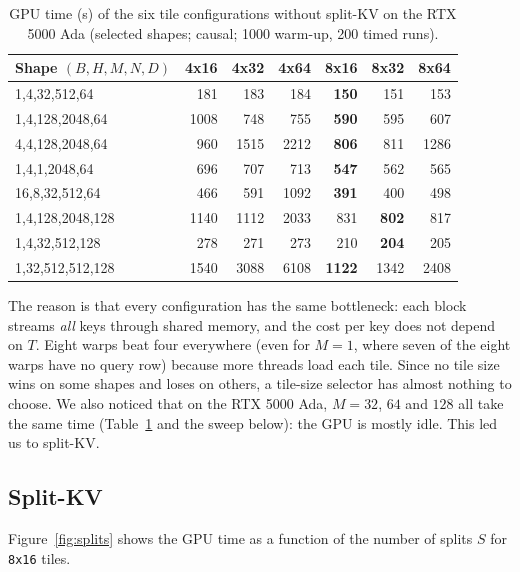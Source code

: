 \documentclass[11pt]{article}
\begin{document}
\begin{table}[H]
\centering
\caption{GPU time (\textmu s) of the six tile configurations without split-KV
on the RTX 5000 Ada (selected shapes; causal; 1000 warm-up, 200 timed runs).}
\label{tab:tiles}
\begin{tabular}{lrrrrrr}
\toprule
Shape $(B,H,M,N,D)$ & 4x16 & 4x32 & 4x64 & 8x16 & 8x32 & 8x64 \\
\midrule
1,4,32,512,64     & 181  & 183  & 184  & \textbf{150}  & 151  & 153 \\
1,4,128,2048,64   & 1008 & 748  & 755  & \textbf{590}  & 595  & 607 \\
4,4,128,2048,64   & 960  & 1515 & 2212 & \textbf{806}  & 811  & 1286 \\
1,4,1,2048,64     & 696  & 707  & 713  & \textbf{547}  & 562  & 565 \\
16,8,32,512,64    & 466  & 591  & 1092 & \textbf{391}  & 400  & 498 \\
1,4,128,2048,128  & 1140 & 1112 & 2033 & 831  & \textbf{802}  & 817 \\
1,4,32,512,128    & 278  & 271  & 273  & 210  & \textbf{204}  & 205 \\
1,32,512,512,128  & 1540 & 3088 & 6108 & \textbf{1122} & 1342 & 2408 \\
\bottomrule
\end{tabular}
\end{table}

The reason is that every configuration has the same bottleneck: each block
streams \emph{all} keys through shared memory, and the cost per key does not
depend on $T$. Eight warps beat four everywhere (even for $M = 1$, where seven
of the eight warps have no query row) because more threads load each tile.
Since no tile size wins on some shapes and loses on others, a tile-size
selector has almost nothing to choose. We also noticed that on the RTX 5000 Ada,
$M = 32$, $64$ and $128$ all take the same time (Table~\ref{tab:tiles} and
the sweep below): the GPU is mostly idle. This led us to split-KV.

\subsection{Split-KV}
Figure~\ref{fig:splits} shows the GPU time as a function of the number of
splits $S$ for \texttt{8x16} tiles.
\end{document}
